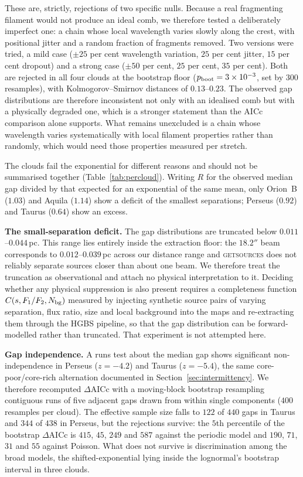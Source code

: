 \documentclass[usenatbib,twoside,twocolumn]{mnras}
\begin{document}
These are, strictly, rejections of two specific nulls. Because a real fragmenting filament would not produce an ideal comb, we therefore tested a deliberately imperfect one: a chain whose local wavelength varies slowly along the crest, with positional jitter and a random fraction of fragments removed. Two versions were tried, a mild case ($\pm25$ per cent wavelength variation, $25$ per cent jitter, $15$ per cent dropout) and a strong case ($\pm50$ per cent, $25$ per cent, $35$ per cent). Both are rejected in all four clouds at the bootstrap floor ($p_{\rm boot}=3\times10^{-3}$, set by $300$ resamples), with Kolmogorov--Smirnov distances of $0.13$--$0.23$. The observed gap distributions are therefore inconsistent not only with an idealised comb but with a physically degraded one, which is a stronger statement than the AICc comparison alone supports. What remains unexcluded is a chain whose wavelength varies systematically with local filament properties rather than randomly, which would need those properties measured per stretch.

The clouds fail the exponential for different reasons and should not be summarised together (Table~\ref{tab:percloud}). Writing $R$ for the observed median gap divided by that expected for an exponential of the same mean, only Orion~B ($1.03$) and Aquila ($1.14$) show a deficit of the smallest separations; Perseus ($0.92$) and Taurus ($0.64$) show an excess.

\smallskip\noindent\textbf{The small-separation deficit.} The gap distributions are truncated below $0.011$--$0.044$\,pc. This range lies entirely inside the extraction floor: the $18.2''$ beam corresponds to $0.012$--$0.039$\,pc across our distance range and \textsc{getsources} does not reliably separate sources closer than about one beam. We therefore treat the truncation as observational and attach no physical interpretation to it. Deciding whether any physical suppression is also present requires a completeness function $C(s,F_1/F_2,N_{\rm bg})$ measured by injecting synthetic source pairs of varying separation, flux ratio, size and local background into the maps and re-extracting them through the HGBS pipeline, so that the gap distribution can be forward-modelled rather than truncated. That experiment is not attempted here.

\smallskip\noindent\textbf{Gap independence.} A runs test about the median gap shows significant non-independence in Perseus ($z=-4.2$) and Taurus ($z=-5.4$), the same core-poor/core-rich alternation documented in Section~\ref{sec:intermittency}. We therefore recomputed $\Delta$AICc with a moving-block bootstrap resampling contiguous runs of five adjacent gaps drawn from within single components ($400$ resamples per cloud). The effective sample size falls to $122$ of $440$ gaps in Taurus and $344$ of $438$ in Perseus, but the rejections survive: the $5$th percentile of the bootstrap $\Delta$AICc is $415$, $45$, $249$ and $587$ against the periodic model and $190$, $71$, $31$ and $55$ against Poisson. What does not survive is discrimination among the broad models, the shifted-exponential lying inside the lognormal's bootstrap interval in three clouds.
\end{document}
